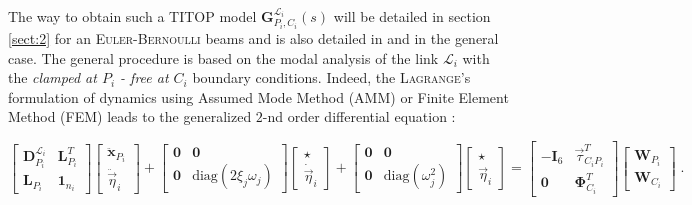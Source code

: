The way to obtain such a TITOP model $\mathbf{G}_{P_i,C_i}^{\mathcal{L}_i}(s)$ will be detailed in section \ref{sect:2} for an \textsc{Euler-Bernoulli} beams and is also detailed in \cite{Alazard2015} and \cite{Perez2015_LM} in the general case. The general procedure is based on the modal analysis of the link $\mathcal{L}_i$ with the \textit{clamped at $P_i$ - free at $C_i$} boundary conditions.  Indeed, the \textsc{Lagrange}'s formulation of dynamics using Assumed Mode Method (AMM) or Finite Element Method (FEM) leads to the generalized $2$-nd order differential equation \cite{TheodoreG95,ShabanaMSD1997}:

\begin{small}
	\begin{equation}\label{eq:2nd1}
	\left[\begin{array}{cc}\mathbf{D}^{\mathcal{L}_i}_{P_i} & \mathbf{L}_{P_i}^T\\ \mathbf{L}_{P_i} & \mathbf{1}_{n_i}\end{array}\right]\left[\begin{array}{c}\ddot{\mathbf{x}}_{P_i}\\ \ddot{\vec{\eta}}_i\end{array}\right]+\left[\begin{array}{cc} \mathbf{0}& \mathbf{0} \\  \mathbf{0} & \mbox{diag}(2\xi_j\omega_j)\end{array}\right]\left[\begin{array}{c}\star \\ \dot{\vec{\eta}}_i\end{array}\right]+\left[\begin{array}{cc} \mathbf{0}& \mathbf{0}\\  \mathbf{0}& \mbox{diag}(\omega_j^2)\end{array}\right]\left[\begin{array}{c}\star \\ \vec{\eta}_i\end{array}\right]=\left[\begin{array}{cc}-\mathbf{I}_6 & \vec{\tau}_{C_iP_i}^T\\ \mathbf{0} &  \mathbf{\Phi}_{C_i}^T \end{array}\right]\left[\begin{array}{c}\mathbf{W}_{P_i} \\ \mathbf{W}_{C_i}\end{array}\right]\;.
	\end{equation}
\end{small}
